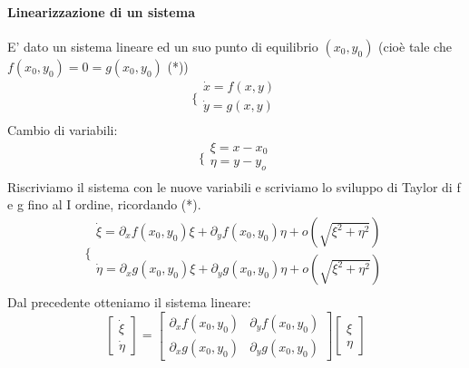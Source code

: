 \documentclass[a4paper,12pt]{article}
\begin{document}
\paragraph{Linearizzazione di un sistema}
E' dato un sistema lineare ed un suo punto di equilibrio $(x_0,y_0)$ (cioè tale che $f(x_0,y_0)=0=g(x_0,y_0)$ (*))
$$\bigg\{ \begin{array}{l}
\dot{x} = f(x,y)\\
\dot{y} = g(x,y)\\
\end{array}$$
Cambio di variabili:
$$\bigg\{ \begin{array}{l}
\xi = x-x_0\\
\eta = y-y_o\\
\end{array}$$
Riscriviamo il sistema con le nuove variabili e scriviamo lo sviluppo di Taylor di f e g fino al I ordine, ricordando (*).
$$\bigg\{ \begin{array}{l}
\dot{\xi} = \partial_xf(x_0,y_0)\xi+\partial_yf(x_0,y_0)\eta + o(\sqrt{\xi^2+\eta^2})\\
\dot{\eta} = \partial_xg(x_0,y_0)\xi+\partial_yg(x_0,y_0)\eta + o(\sqrt{\xi^2+\eta^2})\\
\end{array}$$ 
Dal precedente otteniamo il sistema lineare: 
$$\begin{bmatrix}\dot{\xi} \\ \dot{\eta} \end{bmatrix} 
= \begin{bmatrix} \partial_xf(x_0,y_0) & \partial_yf(x_0,y_0) \\ \partial_xg(x_0,y_0) & \partial_yg(x_0,y_0) \end{bmatrix} \begin{bmatrix}\xi \\ \eta \end{bmatrix}
$$
\end{document}
